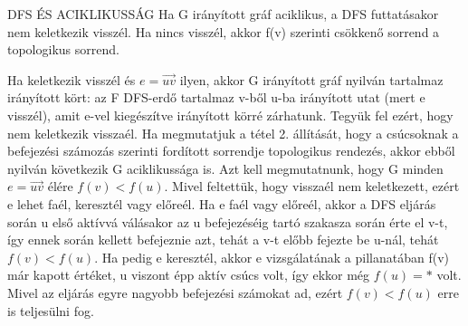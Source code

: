 \begin{tetel}{DFS ÉS ACIKLIKUSSÁG}
Ha G irányított gráf aciklikus, a DFS futtatásakor nem keletkezik visszél. Ha nincs visszél, akkor f(v) szerinti csökkenő sorrend a topologikus sorrend.
\end{tetel}

\begin{bizonyitas}{}
Ha keletkezik visszél és $e = \overrightarrow{uv}$ ilyen, akkor G irányított gráf nyilván tartalmaz irányított kört: az F DFS-erdő tartalmaz v-ből u-ba irányított utat (mert e visszél), amit e-vel kiegészítve irányított körré zárhatunk. Tegyük fel ezért, hogy nem keletkezik visszaél. Ha megmutatjuk a tétel 2. állítását, hogy a csúcsoknak a befejezési számozás szerinti fordított sorrendje topologikus rendezés, akkor ebből nyilván következik G aciklikussága is. Azt kell megmutatnunk, hogy G minden $e = \overrightarrow{uv}$ élére $f(v) < f(u)$. Mivel feltettük, hogy visszaél nem keletkezett, ezért e lehet faél, keresztél vagy előreél. Ha e faél vagy előreél, akkor a DFS eljárás során u első aktívvá válásakor az u befejezéséig tartó szakasza során érte el v-t, így ennek során kellett befejeznie azt, tehát a v-t előbb fejezte be u-nál, tehát $f(v) < f(u)$. Ha pedig e keresztél, akkor e vizsgálatának a pillanatában f(v) már kapott értéket, u viszont épp aktív csúcs volt, így ekkor még $f(u) = *$ volt. Mivel az eljárás egyre nagyobb befejezési számokat ad, ezért $f(v) < f(u)$ erre is teljesülni fog.
\end{bizonyitas}
